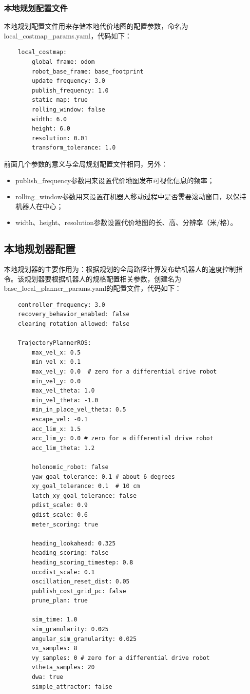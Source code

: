 \documentclass[10pt, oneside]{book}
\begin{document}
\subsubsection{本地规划配置文件}

本地规划配置文件用来存储本地代价地图的配置参数，命名为local\_costmap\_params.yaml，代码如下：

\begin{verbatim}
    local_costmap:
        global_frame: odom
        robot_base_frame: base_footprint
        update_frequency: 3.0
        publish_frequency: 1.0
        static_map: true
        rolling_window: false
        width: 6.0
        height: 6.0
        resolution: 0.01
        transform_tolerance: 1.0
\end{verbatim}

前面几个参数的意义与全局规划配置文件相同，另外：

\begin{itemize}
    \item publish\_frequency参数用来设置代价地图发布可视化信息的频率；
    \item rolling\_window参数用来设置在机器人移动过程中是否需要滚动窗口，以保持机器人在中心；
    \item width、height、resolution参数设置代价地图的长、高、分辨率（米/格）。
\end{itemize}

\subsection{本地规划器配置}

本地规划器的主要作用为：根据规划的全局路径计算发布给机器人的速度控制指令。该规划器要根据机器人的规格配置相关参数，创建名为base\_local\_planner\_params.yaml的配置文件，代码如下：

\begin{verbatim}
    controller_frequency: 3.0
    recovery_behavior_enabled: false
    clearing_rotation_allowed: false

    TrajectoryPlannerROS:
        max_vel_x: 0.5
        min_vel_x: 0.1
        max_vel_y: 0.0  # zero for a differential drive robot
        min_vel_y: 0.0
        max_vel_theta: 1.0
        min_vel_theta: -1.0
        min_in_place_vel_theta: 0.5
        escape_vel: -0.1
        acc_lim_x: 1.5
        acc_lim_y: 0.0 # zero for a differential drive robot
        acc_lim_theta: 1.2

        holonomic_robot: false
        yaw_goal_tolerance: 0.1 # about 6 degrees
        xy_goal_tolerance: 0.1  # 10 cm
        latch_xy_goal_tolerance: false
        pdist_scale: 0.9
        gdist_scale: 0.6
        meter_scoring: true

        heading_lookahead: 0.325
        heading_scoring: false
        heading_scoring_timestep: 0.8
        occdist_scale: 0.1
        oscillation_reset_dist: 0.05
        publish_cost_grid_pc: false
        prune_plan: true

        sim_time: 1.0
        sim_granularity: 0.025
        angular_sim_granularity: 0.025
        vx_samples: 8
        vy_samples: 0 # zero for a differential drive robot
        vtheta_samples: 20
        dwa: true
        simple_attractor: false
\end{verbatim}
\end{document}
